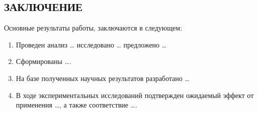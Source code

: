 
%
%
%
%

\begin{singlespace}
  \chapter*{\MakeUppercase{Заключение}}
\end{singlespace}


Основные результаты работы, заключаются в следующем:

\begin{enumerate}
\item Проведен анализ \dots{} исследовано \dots{} предложено \dots{}
\item Сформированы \dots{}.
\item На базе полученных научных результатов разработано \dots{}
\item В ходе экспериментальных исследований подтвержден ожидаемый
  эффект от применения \dots{}, а также соответствие \dots{}.
\end{enumerate}

